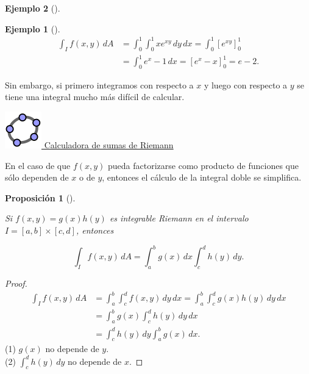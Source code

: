 \documentclass[
  a4paper,
]{scrreport}
\theoremstyle{definition}
\newtheorem{example}{Ejemplo}[chapter]
\theoremstyle{plain}
\theoremstyle{definition}
\theoremstyle{definition}
\theoremstyle{plain}
\theoremstyle{plain}
\newtheorem{proposition}{Proposición}[chapter]
\theoremstyle{remark}
\begin{document}
\begin{example}[]
\begin{example}[]
\begin{align*}
\int_I f(x,y)\, dA 
&= \int_0^1 \int_0^1 xe^{xy}\,dy\,dx 
= \int_0^1 \left[e^{xy}\right]_0^1 \\
&= \int_0^1 e^x-1\,dx
= [e^x-x]_0^1
= e - 2.
\end{align*}

Sin embargo, si primero integramos con respecto a \(x\) y luego con
respecto a \(y\) se tiene una integral mucho más difícil de calcular.

\end{example}

\href{https://www.geogebra.org/classic/s5ve2dxb}{\includegraphics{img/logos/logo-geogebra.png}
Calculadora de sumas de Riemann}

En el caso de que \(f(x,y)\) pueda factorizarse como producto de
funciones que sólo dependen de \(x\) o de \(y\), entonces el cálculo de
la integral doble se simplifica.

\begin{proposition}[]\protect\hypertarget{prp-integral-doble-producto-funciones}{}\label{prp-integral-doble-producto-funciones}

Si \(f(x,y)=g(x)h(y)\) es integrable Riemann en el intervalo
\(I=[a,b]\times [c,d]\), entonces

\[
\int_I f(x,y)\, dA 
= \int_a^b g(x)\,dx \int_c^d h(y)\,dy.
\]

\end{proposition}

\begin{tcolorbox}[enhanced jigsaw, leftrule=.75mm, colbacktitle=quarto-callout-note-color!10!white, toprule=.15mm, opacityback=0, opacitybacktitle=0.6, toptitle=1mm, breakable, bottomtitle=1mm, colframe=quarto-callout-note-color-frame, rightrule=.15mm, titlerule=0mm, title=\textcolor{quarto-callout-note-color}{\faInfo}\hspace{0.5em}{Demostración}, arc=.35mm, left=2mm, bottomrule=.15mm, colback=white, coltitle=black]

\begin{proof}
\begin{align*}
\int_I f(x,y)\, dA 
&= \int_a^b\int_c^d f(x,y)\,dy\,dx
= \int_a^b\int_c^d g(x)h(y)\,dy\,dx \\
&= \int_a^b g(x)\int_c^d h(y)\,dy\,dx \tag{1} \\
&= \int_c^d h(y)\,dy \int_a^b g(x)\,dx \tag{2}.
\end{align*} (1) \(g(x)\) no depende de \(y\).\\
(2) \(\int_c^d h(y)\,dy\) no depende de \(x\).
\end{proof}


\end{tcolorbox}
\end{example}
\end{document}
